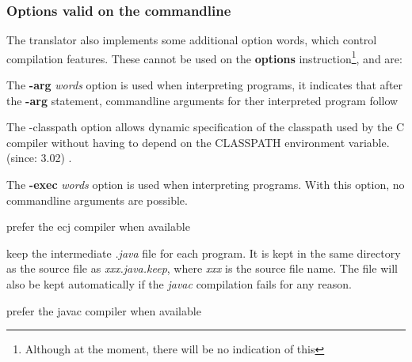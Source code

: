 \subsubsection{Options valid on the commandline}
The translator also implements some additional option words, which
control compilation features.  These cannot be used on the
\textbf{options} instruction\footnote{Although at the moment, there will be no indication of this}, and are:
\begin{description}
\item[arg]
The \textbf{-arg} \emph{words} option is used when interpreting
programs, it indicates that after the \textbf{-arg} statement,
commandline arguments for ther interpreted program follow

\item[classpath]
The -classpath option allows dynamic specification of the classpath
used by the \nr{}C compiler without having to depend on the
CLASSPATH environment variable. (since: \nr{} 3.02)
.
\item[exec]
The \textbf{-exec} \emph{words} option is used when interpreting
programs. With this option, no commandline arguments are possible.
\item[ecj]
prefer the ecj compiler when available 

\item[keep]
keep the intermediate \emph{.java} file for each program.  It is kept in
the same directory as the \nr{} source file as \emph{xxx.java.keep},
where \emph{xxx} is the source file name.  The file will also be kept
automatically if the \emph{javac} compilation fails for any reason.
\item[javac]
prefer the javac compiler when available


\end{description}

